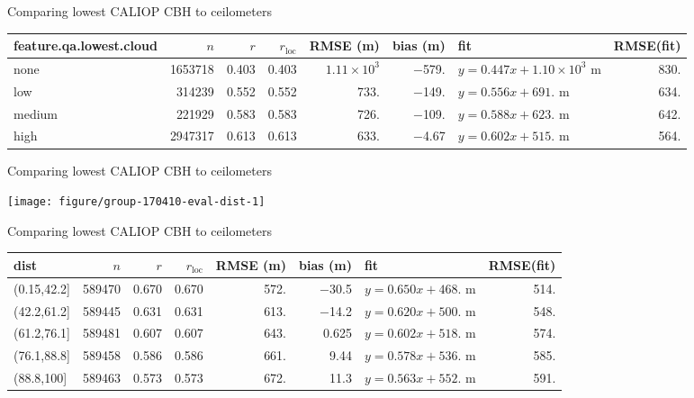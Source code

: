 \documentclass[10pt,notes=all,aspectratio=1610]{beamer}\usepackage[]{graphicx}\usepackage[]{color}
\newenvironment{knitrout}{}{} %
\begin{document}
\begin{frame}[fragile]{Comparing lowest CALIOP CBH to ceilometers}
  \begin{adjustbox}{max width=\textwidth}
\begin{tabular}{lrrrrrlr}
  \hline
\hline
feature.qa.lowest.cloud & $n$ & $r$ & $r_\text{loc}$ & RMSE (m) & bias (m) & fit & RMSE(fit) \\ 
  \hline
none & 1653718 & 0.403 & 0.403 & $1.11 \times 10^{3}$ & $-$579. & $y = 0.447 x + \ensuremath{1.10 \times 10^{3}}$ m & 830. \\ 
  low & 314239 & 0.552 & 0.552 & 733. & $-$149. & $y = 0.556 x + 691.$ m & 634. \\ 
  medium & 221929 & 0.583 & 0.583 & 726. & $-$109. & $y = 0.588 x + 623.$ m & 642. \\ 
  high & 2947317 & 0.613 & 0.613 & 633. & $-$4.67 & $y = 0.602 x + 515.$ m & 564. \\ 
   \hline
\hline
\end{tabular}

  \end{adjustbox}
\end{frame}
\begin{frame}[fragile]{Comparing lowest CALIOP CBH to ceilometers}
\begin{knitrout}
\color{fgcolor}

{\centering \texttt{[image: figure/group-170410-eval-dist-1]} 

}



\end{knitrout}
\end{frame}
\begin{frame}[fragile]{Comparing lowest CALIOP CBH to ceilometers}
  \begin{adjustbox}{max width=\textwidth}
\begin{tabular}{lrrrrrlr}
  \hline
\hline
dist & $n$ & $r$ & $r_\text{loc}$ & RMSE (m) & bias (m) & fit & RMSE(fit) \\ 
  \hline
(0.15,42.2] & 589470 & 0.670 & 0.670 & 572. & $-$30.5 & $y = 0.650 x + 468.$ m & 514. \\ 
  (42.2,61.2] & 589445 & 0.631 & 0.631 & 613. & $-$14.2 & $y = 0.620 x + 500.$ m & 548. \\ 
  (61.2,76.1] & 589481 & 0.607 & 0.607 & 643. & 0.625 & $y = 0.602 x + 518.$ m & 574. \\ 
  (76.1,88.8] & 589458 & 0.586 & 0.586 & 661. & 9.44 & $y = 0.578 x + 536.$ m & 585. \\ 
  (88.8,100] & 589463 & 0.573 & 0.573 & 672. & 11.3 & $y = 0.563 x + 552.$ m & 591. \\ 
   \hline
\hline
\end{tabular}

  \end{adjustbox}
\end{frame}
\end{document}
